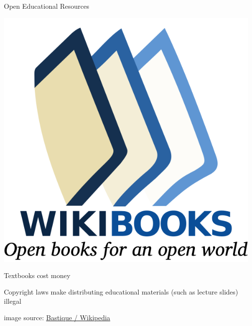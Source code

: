 \documentclass{beamer}
\begin{document}
\begin{frame}{Open Educational Resources}
  \begin{center}
    \includegraphics[height=0.6\textheight]{wikibooks.png}
  \end{center}
  
  Textbooks cost money
  
  Copyright laws make distributing educational materials (such as lecture slides) illegal

  \tiny{image source: \href{https://upload.wikimedia.org/wikipedia/commons/thumb/7/7c/Wikibooks-logo-en.svg/600px-Wikibooks-logo-en.svg.png}{Bastique / Wikipedia}}
\end{frame}
\end{document}
